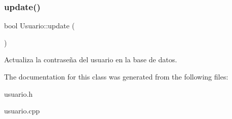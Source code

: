 \subsubsection{\texorpdfstring{update()}{update()}}
{\footnotesize\ttfamily bool Usuario\+::update (\begin{DoxyParamCaption}{ }\end{DoxyParamCaption})}

Actualiza la contraseña del usuario en la base de datos. 

The documentation for this class was generated from the following files\+:\begin{DoxyCompactItemize}
\item 
usuario.\+h\item 
usuario.\+cpp\end{DoxyCompactItemize}
